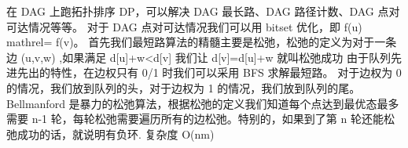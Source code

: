 {}在 \markdownRendererDollarSign{}DAG\markdownRendererDollarSign{} 上跑拓扑排序 \markdownRendererDollarSign{}DP\markdownRendererDollarSign{}，可以解决 \markdownRendererDollarSign{}DAG\markdownRendererDollarSign{} 最长路、\markdownRendererDollarSign{}DAG\markdownRendererDollarSign{} 路径计数、\markdownRendererDollarSign{}DAG\markdownRendererDollarSign{} 点对可达情况等等。\markdownRendererParagraphSeparator
{}对于 \markdownRendererDollarSign{}DAG\markdownRendererDollarSign{} 点对可达情况我们可以用 bitset 优化，即 \markdownRendererDollarSign{}f(u) \markdownRendererBackslash{}mathrel\markdownRendererLeftBrace{}\markdownRendererPipe{}\markdownRendererRightBrace{}= f(v)\markdownRendererDollarSign{}。\markdownRendererInterblockSeparator
{}\markdownRendererInterblockSeparator
{}
\markdownRendererSectionEnd \markdownRendererSectionBegin
{}\markdownRendererInterblockSeparator
{}\markdownRendererSectionBegin
{}\markdownRendererInterblockSeparator
{}首先我们最短路算法的精髓主要是松弛，松弛的定义为对于一条边\markdownRendererDollarSign{} (u,v,w) \markdownRendererDollarSign{},如果满足\markdownRendererDollarSign{} d[u]+w<d[v] \markdownRendererDollarSign{}\markdownRendererParagraphSeparator
{}我们让\markdownRendererDollarSign{} d[v]=d[u]+w \markdownRendererDollarSign{}就叫松弛成功\markdownRendererInterblockSeparator
{}\markdownRendererSectionBegin
{}\markdownRendererInterblockSeparator
{}由于队列先进先出的特性，在边权只有\markdownRendererDollarSign{} 0/1 \markdownRendererDollarSign{}时我们可以采用\markdownRendererDollarSign{} BFS \markdownRendererDollarSign{}求解最短路。\markdownRendererParagraphSeparator
{}对于边权为\markdownRendererDollarSign{} 0 \markdownRendererDollarSign{}的情况，我们放到队列的头，对于边权为\markdownRendererDollarSign{} 1 \markdownRendererDollarSign{}的情况，我们放到队列的尾。\markdownRendererInterblockSeparator
{}
\markdownRendererSectionEnd \markdownRendererSectionBegin
{}\markdownRendererInterblockSeparator
{}\markdownRendererDollarSign{} Bellmanford \markdownRendererDollarSign{}是暴力的松弛算法，根据松弛的定义我们知道每个点达到最优态最多需要\markdownRendererDollarSign{} n-1 \markdownRendererDollarSign{}轮，每轮松弛需要遍历所有的边松弛。特别的，如果到了第\markdownRendererDollarSign{} n \markdownRendererDollarSign{}轮还能松弛成功的话，就说明有负环.\markdownRendererParagraphSeparator
{}复杂度\markdownRendererDollarSign{} O(nm) \markdownRendererDollarSign{}\markdownRendererParagraphSeparator
